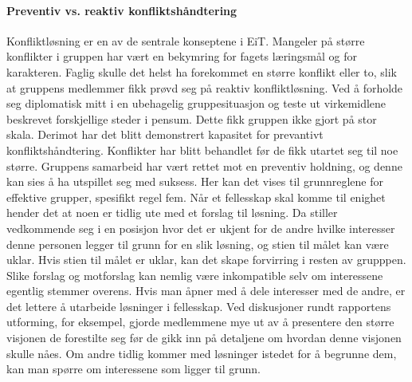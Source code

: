 \paragraph{Preventiv vs. reaktiv konfliktshåndtering}
Konfliktløsning er en av de sentrale konseptene i EiT.
Mangeler på større konflikter i gruppen har vært en bekymring for fagets læringsmål og for karakteren. 
Faglig skulle det helst ha forekommet en større konflikt eller to, slik at gruppens medlemmer fikk prøvd seg på reaktiv konfliktløsning. 
Ved å forholde seg diplomatisk mitt i en ubehagelig gruppesituasjon og teste ut virkemidlene beskrevet forskjellige steder i pensum. 
Dette fikk gruppen ikke gjort på stor skala.
Derimot har det blitt demonstrert kapasitet for prevantivt konfliktshåndtering. 
Konflikter har blitt behandlet før de fikk utartet seg til noe større. 
Gruppens samarbeid har vært rettet mot en preventiv holdning, og denne kan sies å ha utspillet seg med suksess. 
Her kan det vises til grunnreglene for effektive grupper\cite{schwarz}, spesifikt regel fem. 
Når et fellesskap skal komme til enighet hender det at noen er tidlig ute med et forslag til løsning.
Da stiller vedkommende seg i en posisjon hvor det er ukjent for de andre hvilke interesser denne personen legger til  grunn for en slik løsning, og stien til målet kan være uklar. 
Hvis stien til målet er uklar, kan det skape forvirring i resten av grupppen. 
Slike forslag og motforslag kan nemlig være inkompatible selv om interessene egentlig stemmer overens.
Hvis man åpner med å dele interesser med de andre, er det lettere å utarbeide løsninger i fellesskap.
Ved diskusjoner rundt rapportens utforming, for eksempel, gjorde medlemmene mye ut av å presentere den større visjonen de forestilte seg før de gikk inn på detaljene om hvordan denne visjonen skulle nåes. 
Om andre tidlig kommer med løsninger istedet for å begrunne dem, kan man spørre om interessene som ligger til grunn.
\\
